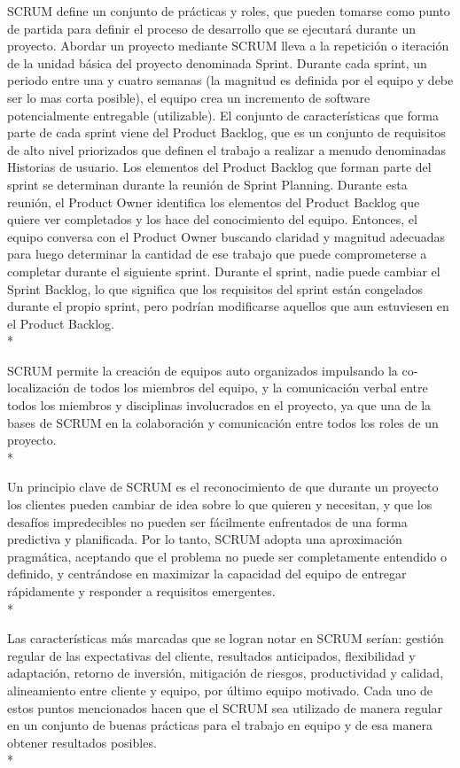 \documentclass[../pfc.tex]{subfiles}
\begin{document}
	SCRUM define un conjunto de prácticas y roles, que pueden tomarse como punto de partida para definir el proceso de desarrollo que se ejecutará durante un proyecto. Abordar un proyecto mediante SCRUM lleva a la repetición o iteración de la unidad básica del proyecto denominada Sprint. Durante cada sprint, un periodo entre una y cuatro semanas (la magnitud es definida por el equipo y debe ser lo mas corta posible), el equipo crea un incremento de software potencialmente entregable (utilizable). El conjunto de características que forma parte de cada sprint viene del Product Backlog, que es un conjunto de requisitos de alto nivel priorizados que definen el trabajo a realizar a menudo denominadas Historias de usuario. Los elementos del Product Backlog que forman parte del sprint se determinan durante la reunión de Sprint Planning. Durante esta reunión, el Product Owner identifica los elementos del Product Backlog que quiere ver completados y los hace del conocimiento del equipo. Entonces, el equipo conversa con el Product Owner buscando claridad y magnitud adecuadas para luego determinar la cantidad de ese trabajo que puede comprometerse a completar durante el siguiente sprint. Durante el sprint, nadie puede cambiar el Sprint Backlog, lo que significa que los requisitos del sprint están congelados durante el propio sprint, pero podrían modificarse aquellos que aun estuviesen en el Product Backlog.\\*
	
	SCRUM permite la creación de equipos auto organizados impulsando la co-localización de todos los miembros del equipo, y la comunicación verbal entre todos los miembros y disciplinas involucrados en el proyecto, ya que una de la bases de SCRUM en la colaboración y comunicación entre todos los roles de un proyecto. \\*
	
	Un principio clave de SCRUM es el reconocimiento de que durante un proyecto los clientes pueden cambiar de idea sobre lo que quieren y necesitan, y que los desafíos impredecibles no pueden ser fácilmente enfrentados de una forma predictiva y planificada. Por lo tanto, SCRUM adopta una aproximación pragmática, aceptando que el problema no puede ser completamente entendido o definido, y centrándose en maximizar la capacidad del equipo de entregar rápidamente y responder a requisitos emergentes.\\*
	
	Las características más marcadas que se logran notar en SCRUM serían: gestión regular de las expectativas del cliente, resultados anticipados, flexibilidad y adaptación, retorno de inversión, mitigación de riesgos, productividad y calidad, alineamiento entre cliente y equipo, por último equipo motivado. Cada uno de estos puntos mencionados hacen que el SCRUM sea utilizado de manera regular en un conjunto de buenas prácticas para el trabajo en equipo y de esa manera obtener resultados posibles.\\*
	
\end{document}
